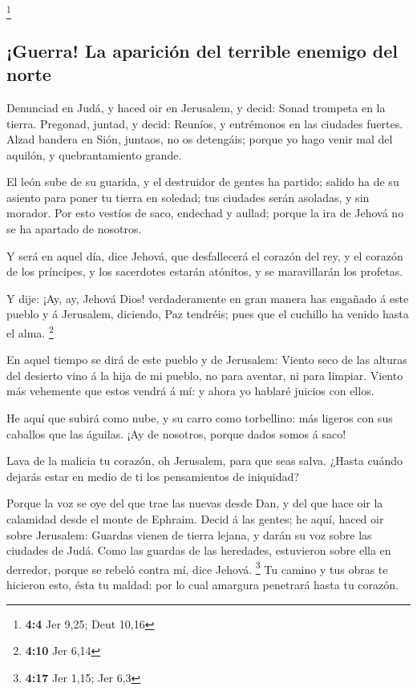 \footnote{\textbf{4:4} Jer 9,25; Deut 10,16}

\hypertarget{guerra-la-apariciuxf3n-del-terrible-enemigo-del-norte}{%
\subsection{¡Guerra! La aparición del terrible enemigo del
norte}\label{guerra-la-apariciuxf3n-del-terrible-enemigo-del-norte}}

 Denunciad en Judá, y haced oir en Jerusalem, y decid:
Sonad trompeta en la tierra. Pregonad, juntad, y decid: Reuníos, y
entrémonos en las ciudades fuertes.  Alzad bandera en
Sión, juntaos, no os detengáis; porque yo hago venir mal del aquilón, y
quebrantamiento grande.

 El león sube de su guarida, y el destruidor de gentes ha
partido; salido ha de su asiento para poner tu tierra en soledad; tus
ciudades serán asoladas, y sin morador.  Por esto vestíos
de saco, endechad y aullad; porque la ira de Jehová no se ha apartado de
nosotros.

 Y será en aquel día, dice Jehová, que desfallecerá el
corazón del rey, y el corazón de los príncipes, y los sacerdotes estarán
atónitos, y se maravillarán los profetas.

 Y dije: ¡Ay, ay, Jehová Dios! verdaderamente en gran
manera has engañado á este pueblo y á Jerusalem, diciendo, Paz tendréis;
pues que el cuchillo ha venido hasta el alma. \footnote{\textbf{4:10}
  Jer 6,14}

 En aquel tiempo se dirá de este pueblo y de Jerusalem:
Viento seco de las alturas del desierto vino á la hija de mi pueblo, no
para aventar, ni para limpiar.  Viento más vehemente que
estos vendrá á mí: y ahora yo hablaré juicios con ellos.

 He aquí que subirá como nube, y su carro como
torbellino: más ligeros con sus caballos que las águilas. ¡Ay de
nosotros, porque dados somos á saco!

 Lava de la malicia tu corazón, oh Jerusalem, para que
seas salva. ¿Hasta cuándo dejarás estar en medio de ti los pensamientos
de iniquidad?

 Porque la voz se oye del que trae las nuevas desde Dan,
y del que hace oir la calamidad desde el monte de Ephraim.
 Decid á las gentes; he aquí, haced oir sobre Jerusalem:
Guardas vienen de tierra lejana, y darán su voz sobre las ciudades de
Judá.  Como las guardas de las heredades, estuvieron
sobre ella en derredor, porque se rebeló contra mí, dice Jehová.
\footnote{\textbf{4:17} Jer 1,15; Jer 6,3}  Tu camino y
tus obras te hicieron esto, ésta tu maldad: por lo cual amargura
penetrará hasta tu corazón.

